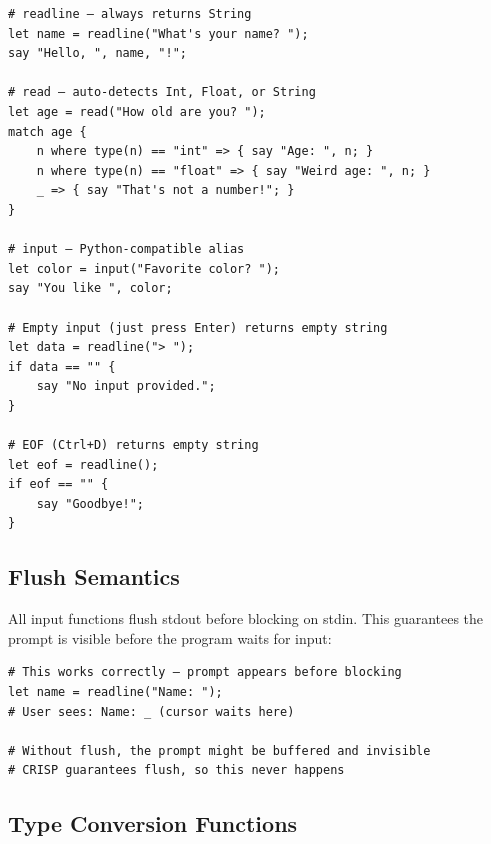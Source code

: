 \begin{tcolorbox}[colback=codebg, colframe=darkpurple, colbacktitle=darkpurple, title=\textbf{\textcolor{codegold}{Input Functions}}, fonttitle=\bfseries, sharp corners]
\begin{lstlisting}
# readline — always returns String
let name = readline("What's your name? ");
say "Hello, ", name, "!";

# read — auto-detects Int, Float, or String
let age = read("How old are you? ");
match age {
    n where type(n) == "int" => { say "Age: ", n; }
    n where type(n) == "float" => { say "Weird age: ", n; }
    _ => { say "That's not a number!"; }
}

# input — Python-compatible alias
let color = input("Favorite color? ");
say "You like ", color;

# Empty input (just press Enter) returns empty string
let data = readline("> ");
if data == "" {
    say "No input provided.";
}

# EOF (Ctrl+D) returns empty string
let eof = readline();
if eof == "" {
    say "Goodbye!";
}
\end{lstlisting}
\end{tcolorbox}

\subsection{Flush Semantics}

All input functions flush stdout before blocking on stdin. This guarantees the prompt is visible before the program waits for input:

\begin{tcolorbox}[colback=codebg, colframe=darkpurple, colbacktitle=darkpurple, title=\textbf{\textcolor{codegold}{Flush Guarantee}}, fonttitle=\bfseries, sharp corners]
\begin{lstlisting}
# This works correctly — prompt appears before blocking
let name = readline("Name: ");
# User sees: Name: _ (cursor waits here)

# Without flush, the prompt might be buffered and invisible
# CRISP guarantees flush, so this never happens
\end{lstlisting}
\end{tcolorbox}

\subsection{Type Conversion Functions}

